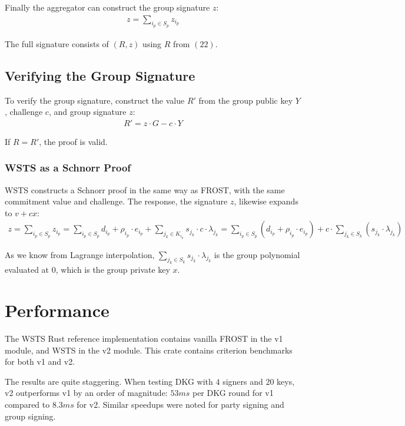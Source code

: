 \documentclass{article}
\begin{document}
Finally the aggregator can construct the group signature $z$:
\begin{align}
  z = \sum_{i_p \in S_p}^{} z_{i_p}
\end{align}

The full signature consists of $(R, z)$ using $R$ from $(22)$.

\subsection{
  Verifying the Group Signature
}

To verify the group signature, construct the value $R'$ from the group public key $Y$, challenge $c$, and group signature $z$:
\begin{align}
  R' = z \cdot G - c \cdot Y
\end{align}

If $R = R'$, the proof is valid.

\subsubsection{
  WSTS as a Schnorr Proof
}

WSTS constructs a Schnorr proof in the same way as FROST, with the same commitment value and challenge.  The response, the signature $z$, likewise expands to $v + cx$:
\begin{align}
  z = \sum_{i_p \in S_p}^{} z_{i_p} = \sum_{i_p \in S_p}^{} d_{i_p} + \rho_{i_p} \cdot e_{i_p} + \sum_{j_k \in K_{i_p}}^{} s_{j_k} \cdot c \cdot \lambda_{j_k} = \sum_{i_p \in S_p}^{} (d_{i_p} + \rho_{i_p} \cdot e_{i_p}) + c \cdot \sum_{j_k \in S_k}^{} (s_{j_k} \cdot \lambda_{j_k})\nonumber
\end{align}

As we know from Lagrange interpolation, $\sum_{j_k \in S_k}^{} s_{j_k} \cdot \lambda_{j_k}$ is the group polynomial evaluated at $0$, which is the group private key $x$.


\newpage
\onecolumn
\section{
  Performance
}

The WSTS Rust reference implementation \cite{tmfrost} contains vanilla FROST in the v1 module, and WSTS in the v2 module.  This crate contains criterion benchmarks for both v1 and v2.

The results are quite staggering.  When testing DKG with $4$ signers and $20$ keys, v2 outperforms v1 by an order of magnitude: $53 ms$ per DKG round for v1 compared to $8.3 ms$ for v2.  Similar speedups were noted for party signing and group signing.
\end{document}
